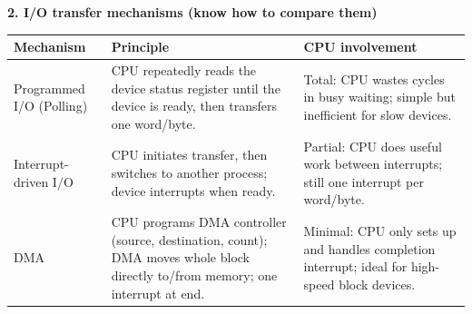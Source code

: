 \documentclass[11pt]{article}
\begin{document}
\begin{bilan}
\textbf{2. I/O transfer mechanisms (know how to compare them)}
\begin{center}
\begin{tabularx}{\linewidth}{|l|X|X|}
\hline
\rowcolor{popblueL} \textbf{Mechanism} & \textbf{Principle} & \textbf{CPU involvement} \\
\hline
Programmed I/O (Polling) & CPU repeatedly reads the device status register until the device is ready, then transfers one word/byte. & Total: CPU wastes cycles in busy waiting; simple but inefficient for slow devices. \\
\hline
Interrupt-driven I/O & CPU initiates transfer, then switches to another process; device interrupts when ready. & Partial: CPU does useful work between interrupts; still one interrupt per word/byte. \\
\hline
DMA & CPU programs DMA controller (source, destination, count); DMA moves whole block directly to/from memory; one interrupt at end. & Minimal: CPU only sets up and handles completion interrupt; ideal for high-speed block devices. \\
\hline
\end{tabularx}
\end{center}


\end{bilan}
\end{document}
